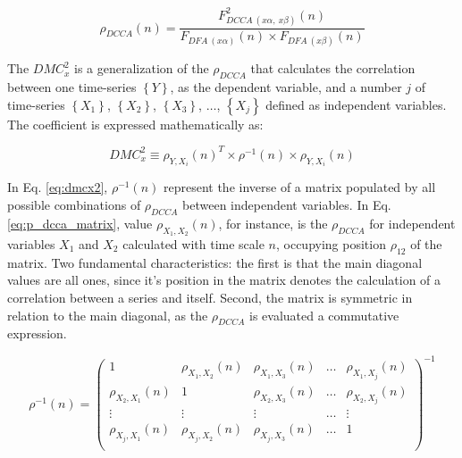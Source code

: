 \documentclass[article]{jss}
\begin{document}
\begin{equation}
  {\rho}_{DCCA}(n) = \frac{F_{DCCA~(x\alpha,~x\beta)}^{2}(n)}
  {F_{DFA~(x\alpha)}(n) \times F_{DFA~(x\beta)}(n)}
  \label{eq:p_dcca}
\end{equation}

The $DMC_x^2$ is a generalization of the $\rho_{DCCA}$ that calculates the correlation between one time-series $\left\lbrace Y \right\rbrace $, as the  dependent variable, and a number $j$ of time-series $\left\lbrace X_{1} \right\rbrace $, $\left\lbrace X_{2} \right\rbrace $, $\left\lbrace X_{3} \right\rbrace $, $\dots $, $\left\lbrace X_{j} \right\rbrace $ defined as independent variables. The coefficient is expressed mathematically as:

\begin{equation}
  {DMC}_{x}^{2}  \equiv \rho_{Y,X_{i}}(n)^{T} \times \rho^{-1}(n) \times \rho_{Y,X_{i}}(n)
  \label{eq:dmcx2}
\end{equation}

In Eq. \ref{eq:dmcx2}, $\rho^{-1}(n)$ represent the inverse of a matrix populated by all possible combinations of $\rho_{DCCA}$ between independent variables. In Eq. \ref{eq:p_dcca_matrix}, value $\rho_{X_{1},X_{2}}(n)$, for instance, is the $\rho_{DCCA}$ for independent variables $X_{1}$ and $X_{2}$ calculated with time scale $n$, occupying position $\rho_{1 2}$ of the matrix. Two fundamental characteristics: the first is that the main diagonal values are all ones, since it's position in the matrix denotes the calculation of a correlation between a series and itself. Second, the matrix is symmetric in relation to the main diagonal, as the $\rho_{DCCA}$ is evaluated a commutative expression.

\begin{equation}
  \rho^{-1}(n) = \left(\begin{matrix}
    1                     & \rho_{X_{1},X_{2}}(n) & \rho_{X_{1},X_{3}}(n) & \dots & \rho_{X_{1},X_{j}}(n) \\
    \rho_{X_{2},X_{1}}(n) & 1                     & \rho_{X_{2},X_{3}}(n) & \dots & \rho_{X_{2},X_{j}}(n) \\
    \vdots                & \vdots                & \vdots                & \dots & \vdots                \\
    \rho_{X_{j},X_{1}}(n) & \rho_{X_{j},X_{2}}(n) & \rho_{X_{j},X_{3}}(n) & \dots & 1                     \\
  \end{matrix}\right)^{-1}
  \label{eq:p_dcca_matrix}
\end{equation}
\end{document}
